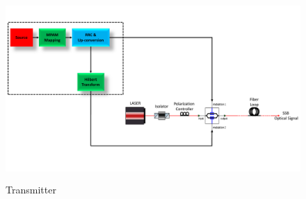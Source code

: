 \begin{figure}[h]
	\centering
	\includegraphics[width=1.0\textwidth, height=7cm]{./sdf/simplified_coherent_receiver/figures/Single_Polarization_Tx.pdf}
	\caption{Transmitter}\label{Transmitter}
\end{figure}

